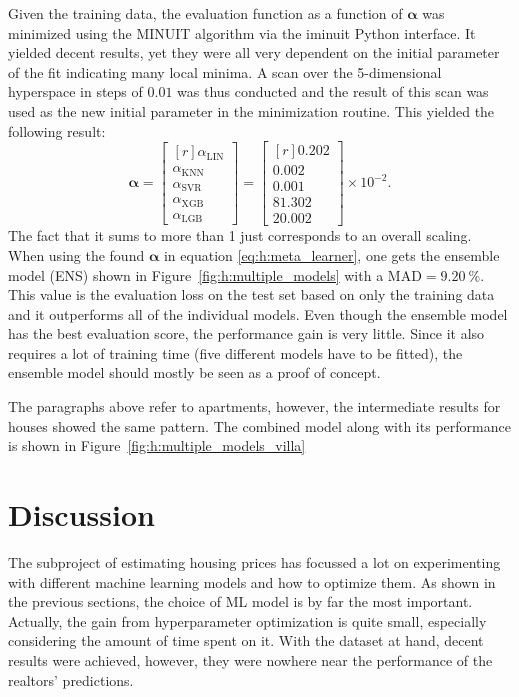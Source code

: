 Given the training data, the evaluation function as a function of $\bm{\alpha}$ was minimized using the MINUIT algorithm \cite{1975CoPhC..10..343J} via the iminuit \cite{iminuit} Python interface. It yielded decent results, yet they were all very dependent on the initial parameter of the fit indicating many local minima. A scan over the 5-dimensional hyperspace in steps of $0.01$ was thus conducted and the result of this scan was used as the new initial parameter in the minimization routine. This yielded the following result:
\begin{equation}
  \bm{\alpha} = \begin{bmatrix*}[r] \alpha_\mathrm{LIN} \\  \alpha_\mathrm{KNN} \\ \alpha_\mathrm{SVR} \\ \alpha_\mathrm{XGB} \\ \alpha_\mathrm{LGB} \end{bmatrix*} = \begin{bmatrix*}[r] 0.202 \\  0.002 \\ 0.001 \\ 81.302 \\ 20.002 \end{bmatrix*} \times 10^{-2}.
\end{equation}
The fact that it sums to more than \num{1} just corresponds to an overall scaling. When using the found $\bm{\alpha}$ in equation \eqref{eq:h:meta_learner}, one gets the ensemble model (ENS) shown in Figure~\ref{fig:h:multiple_models} with a $\mathrm{MAD} = \SI{9.20}{\percent}$. This value is the evaluation loss on the test set based on only the training data and it outperforms all of the individual models. Even though the ensemble model has the best evaluation score, the performance gain is very little. Since it also requires a lot of training time (five different models have to be fitted), the ensemble model should mostly be seen as a proof of concept.

The paragraphs above refer to apartments, however, the intermediate results for houses showed the same pattern. The combined model along with its performance is shown in Figure~\ref{fig:h:multiple_models_villa}

\section{Discussion}
\label{sec:h:discussion}

The subproject of estimating housing prices has focussed a lot on experimenting with different machine learning models and how to optimize them. As shown in the previous sections, the choice of ML model is by far the most important. Actually, the gain from hyperparameter optimization is quite small, especially considering the amount of time spent on it. With the dataset at hand, decent results were achieved, however, they were nowhere near the performance of the realtors' predictions. 

